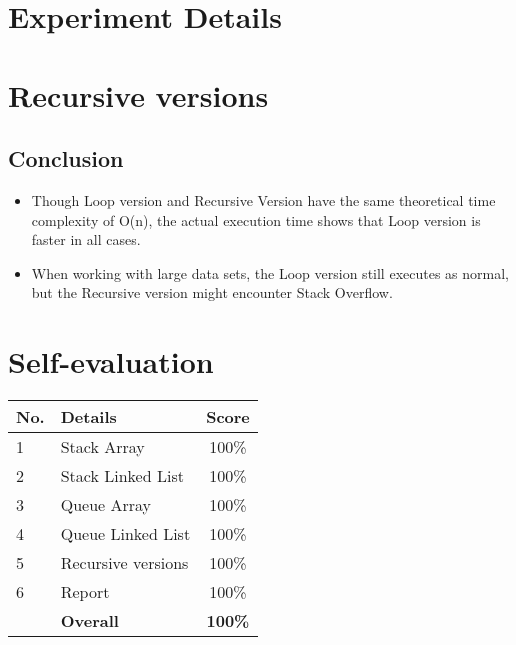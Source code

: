 \documentclass[a4paper, 12pt]{article}
\begin{document}


\tableofcontents\thispagestyle{empty}

\pagebreak
\section{Experiment Details}


\pagebreak
\section{Recursive versions}


\subsection{Conclusion}
\begin{itemize}
	\item Though Loop version and Recursive Version have the same theoretical time complexity of O(n), the actual execution time shows that Loop version is faster in all cases.
	\item When working with large data sets, the Loop version still executes as normal, but the Recursive version might encounter Stack Overflow.
\end{itemize}

\pagebreak
\section{Self-evaluation}
\begin{center}
	\renewcommand{\arraystretch}{1.5}
	\begin{tabular}{|l|p{}|c|}
		\hline
		\textbf{No.} & \textbf{Details}   & \textbf{Score} \\ \hline
		1            & Stack Array        & 100\%          \\ \hline
		2            & Stack Linked List  & 100\%          \\ \hline
		3            & Queue Array        & 100\%          \\ \hline
		4            & Queue Linked List  & 100\%          \\ \hline
		5            & Recursive versions & 100\%          \\ \hline
		6            & Report             & 100\%          \\ \hline
		             & \textbf{Overall}   & \textbf{100\%} \\ \hline
	\end{tabular}
\end{center}
\end{document}
